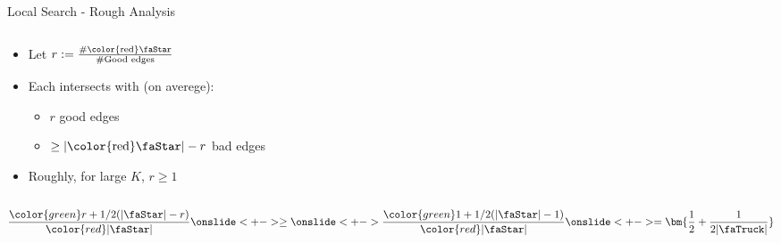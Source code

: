 \begin{frame}{Local Search - Rough Analysis}
\begin{columns}
\begin{column}{.63\textwidth}

\begin{itemize}[<+->]
\item Let $r := \frac{\#\text{\color{red}\faStar}}{\#\text{Good edges}}$ 
	\item Each {\color{red}\faStar} intersects with (on averege):
	\begin{itemize}
	  \item $r$ good edges
	  \item $\geq |\text{\color{red}\faStar}| - r$ bad edges
	\end{itemize}
	\item Roughly, for large $K$, $r \geq 1$
\end{itemize}
\end{column}
\begin{column}{.49\textwidth}

\end{column}
\end{columns}

\onslide<+->
\vfill
$$
\frac{\color{green} r + 1/2 (|\text{\faStar}| - r)}
{\color{red} |\text{\faStar}|} 
\onslide<+->
\geq
\onslide<+->
\frac{\color{green} 1 + 1/2 (|\text{\faStar}| - 1)}
{\color{red} |\text{\faStar}|} 
\onslide<+->
=
\bm{\frac{1}{2} + \frac{1}{2 |\text{\faTruck}|}}
$$
\end{frame}
